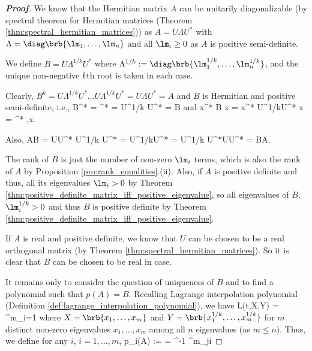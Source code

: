 \begin{proof}[\bf Proof]
We know that the Hermitian matrix $A$ can be unitarily diagonalizable (by spectral theorem for Hermitian matrices (Theorem \ref{thm:spectral_hermitian_matrices})) as $A = U\Lambda U^*$ with $\Lambda
= \diag\brb{\lm_1,\dots,\lm_n}$ and all $\lm_i \geq 0$ as $A$ is positive semi-definite.

We define $B = U\Lambda^{1/k} U^*$ where $\Lambda^{1/k} := \diag\brb{\lm_1^{1/k},\dots,\lm_n^{1/k}}$, and the unique non-negative $k$th root is taken in each case.

Clearly, $B^k = U\Lambda^{1/k}U^* \dots U\Lambda^{1/k}U^* = U\Lambda U^* = A$ and $B$ is Hermitian and positive semi-definite, i.e.,
\be
B^* = ^* = U\Lambda^{1/k} U^* = B\qquad {}
\ee
and
\be
x^* B x = x^* U\Lambda^{1/k}U^* x = ^*  ,\qquad \forall x.
\ee

Also,
\be
AB = U\Lambda U^* U\Lambda^{1/k} U^* = U\Lambda^{1/k}\Lambda U^* = U\Lambda^{1/k} U^*U\Lambda U^* = BA.
\ee

The rank of $B$ is just the number of non-zero $\lm_i$ terms, which is also the rank of $A$ by Proposition \ref{pro:rank_equalities}.(ii). Also, if $A$ is positive definite and thus, all its
eigenvalues $\lm_i>0$ by Theorem \ref{thm:positive_definite_matrix_iff_positive_eigenvalue}, so all eigenvalues of $B$, $\lm_i^{1/k} >0$ and thus $B$ is positive definite by Theorem
\ref{thm:positive_definite_matrix_iff_positive_eigenvalue}.

If $A$ is real and positive definite, we know that $U$ can be chosen to be a real orthogonal matrix (by Theorem \ref{thm:spectral_hermitian_matrices}). So it is clear that $B$ can be chosen to be
real in case.

It remains only to consider the question of uniqueness of $B$ and to find a polynomial such that $p(A) = B$. Recalling Lagrange interpolation polynomial (Definition
\ref{def:lagrange_interpolation_polynomial}), we have
\be
L(t,X,Y) = \sum^m_{i=1} 
\ee
where $X = \brb{x_1,\dots,x_m}$ and $Y= \brb{x_1^{1/k},\dots,x_m^{1/k}}$ for $m$ distinct non-zero eigenvalues $x_1,\dots,x_m$ among all $n$ eigenvalues (as $m\leq n$). Thus, we define for any $i$, $i=1,\dots,m$,
\be
p_i(A) :=  = ^{-1}  \prod^m_{j\neq i}
\ee


\end{proof}
